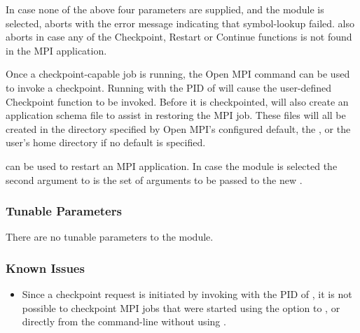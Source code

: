 
In case none of the above four parameters are supplied, and the  
module is selected,  aborts with the error message indicating 
that symbol-lookup failed.   also aborts in case any of the 
Checkpoint, Restart or Continue functions is not found in the MPI application.

Once a checkpoint-capable job is running, the Open MPI command
 can be used to invoke a checkpoint.  Running
 with the PID of  will cause the user-defined 
Checkpoint function to be invoked.  Before it is checkpointed, 
will also create an application schema file to assist in restoring the
MPI job.  These files will all be created in the directory specified
by Open MPI's configured default, the , or
the user's home directory if no default is specified.

 can be used to restart an MPI application.  In case the 
 module is selected the second argument to  is the 
set of arguments to be passed to the new .    

\subsubsection{Tunable Parameters}

There are no tunable parameters to the   module.

 
\subsubsection{Known Issues}

\begin{itemize}

\item Since a checkpoint request is initiated by invoking
   with the PID of , it is not possible to
  checkpoint MPI jobs that were started using the  option to
  , or directly from the command-line without using . 

\end{itemize}

